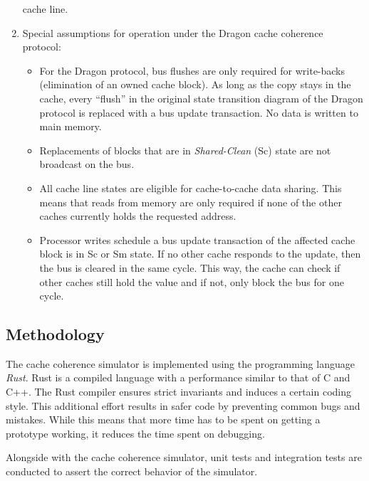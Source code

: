 \begin{enumerate}
          cache line.
    \item Special assumptions for operation under the Dragon cache coherence protocol:
          \begin{itemize}
              \item For the Dragon protocol, bus flushes are only required for write-backs (elimination of an
                    owned cache block). As long as the copy stays in the cache, every ``flush''
                    in the original state transition diagram of the Dragon protocol is replaced with a bus update transaction. No
                    data is written to main memory.
              \item Replacements of blocks that are in \emph{Shared-Clean} (Sc) state are not broadcast on the bus.
              \item All cache line states are eligible for cache-to-cache data sharing. This
                    means that reads from memory are only required if none of the other caches currently holds the requested
                    address.
              \item Processor writes schedule a bus update transaction of the affected cache block is in Sc or Sm state. If no
                    other cache responds to
                    the update, then the bus is cleared in the same cycle. This way, the cache can check if other caches
                    still hold the value and if not, only block the bus for one cycle.
          \end{itemize}

\end{enumerate}
\subsection{Methodology}
The cache coherence simulator is implemented using the programming language \emph{Rust}.
Rust is a compiled language with a performance similar to that of C and C++.
The Rust compiler ensures strict invariants and induces a certain coding style. This additional
effort results in safer code by preventing common bugs and mistakes. While this means that more time
has to be spent on getting a prototype working, it reduces the time spent on debugging.

Alongside with the cache coherence simulator, unit tests and integration tests are conducted to assert the correct behavior of the simulator.

